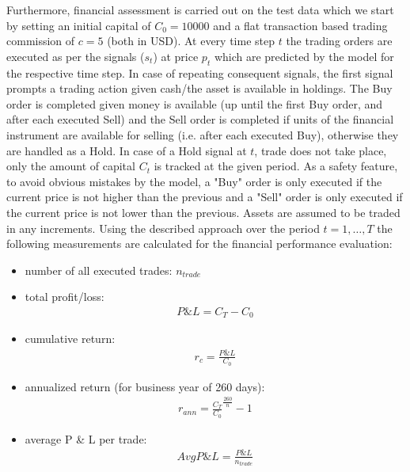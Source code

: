 \documentclass[11pt, a4paper]{article}
\begin{document}
Furthermore, financial assessment is carried out on the test data which we start by setting an initial capital of $C_0 = 10000$ and a flat transaction based trading commission of $c = 5$ (both in USD). At every time step $t$ the trading orders are executed as per the signals ($s_t$) at price $p_t$ which are predicted by the model for the respective time step.
In case of repeating consequent signals, the first signal prompts a trading action given cash/the asset is available in holdings. The Buy order is completed given money is available (up until the first Buy order, and after each executed Sell) and the Sell order is completed if units of the financial instrument are available for selling (i.e. after each executed Buy), otherwise they are handled as a Hold. In case of a Hold signal at $t$, trade does not take place, only the amount of capital $C_t$ is tracked at the given period. As a safety feature, to avoid obvious mistakes by the model, a "Buy" order is only executed if the current price is not higher than the previous and a "Sell" order is only executed if the current price is not lower than the previous.
Assets are assumed to be traded in any increments. Using the described approach over the period $t=1, \dots, T$ the following measurements are calculated for the financial performance evaluation:

\begin{itemize}
    \item number of all executed trades: $n_{trade}$
    \item total profit/loss: 
    \begin{align}
        \label{eq:totPL}
            P\& L = C_T - C_0
    \end{align}
    \item cumulative return: 
    \begin{align}
        \label{eq:cumret}
            r_c = \frac{P \& L}{C_0}
    \end{align}
    \item annualized return (for business year of 260 days): 
    \begin{align}
        \label{eq:annualized}
            r_{ann} = \frac{C_T}{C_0}^{\frac{260}{n}}-1
    \end{align}
    \item average P \& L per trade:
    \begin{align}
        \label{eq:avgpl}
        AvgP \& L = \frac{P \& L}{n_{trade}}
    \end{align}
\end{itemize}
\end{document}
